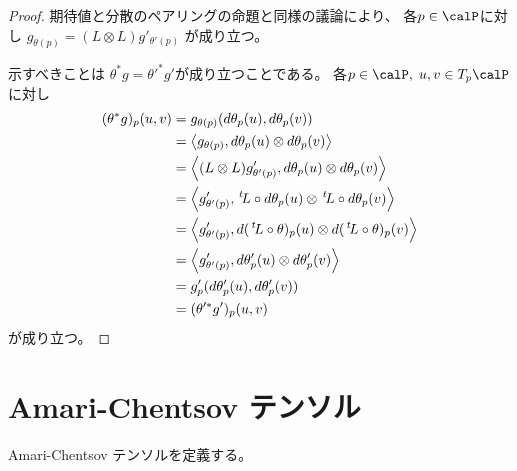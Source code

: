 \documentclass[report]{jlreq}
\begin{document}
\begin{proof}
    期待値と分散のペアリングの命題と同様の議論により、
    各$p \in \calP$に対し
    $g_{\theta(p)} = (L \otimes L) g'_{\theta'(p)}$
    が成り立つ。

    示すべきことは
    $\theta^* g = \theta'^* g'$が成り立つことである。
    各$p \in \calP, \; u, v \in T_p\calP$に対し
    \begin{alignat}{1}
        (\theta^* g)_p(u, v)
            &=
                g_{\theta(p)} (d\theta_p(u), d\theta_p(v))
                \\
            &=
                \left\langle{
                    g_{\theta(p)}
                },{
                    d\theta_p(u) \otimes d\theta_p(v)
                }\right\rangle
                \\
            &=
                \left\langle{
                    (L \otimes L) g'_{\theta'(p)}
                },{
                    d\theta_p(u) \otimes d\theta_p(v)
                }\right\rangle
                \\
            &=
                \left\langle{
                    g'_{\theta'(p)}
                },{
                    \,{}^{t}\!L \circ d\theta_p(u) \otimes \,{}^{t}\!L \circ d\theta_p(v)
                }\right\rangle
                \\
            &=
                \left\langle{
                    g'_{\theta'(p)}
                },{
                    d(\,{}^{t}\!L \circ \theta)_p (u) \otimes d(\,{}^{t}\!L \circ \theta)_p (v)
                }\right\rangle
                \\
            &=
                \left\langle{
                    g'_{\theta'(p)}
                },{
                    d\theta'_p (u) \otimes d\theta'_p (v)
                }\right\rangle
                \\
            &=
                g'_p (d\theta'_p(u), d\theta'_p(v))
                \\
            &=
                (\theta'^* g')_p(u, v)
    \end{alignat}
    が成り立つ。
\end{proof}

%
\section{Amari-Chentsov テンソル}

Amari-Chentsov テンソルを定義する。
\end{document}
